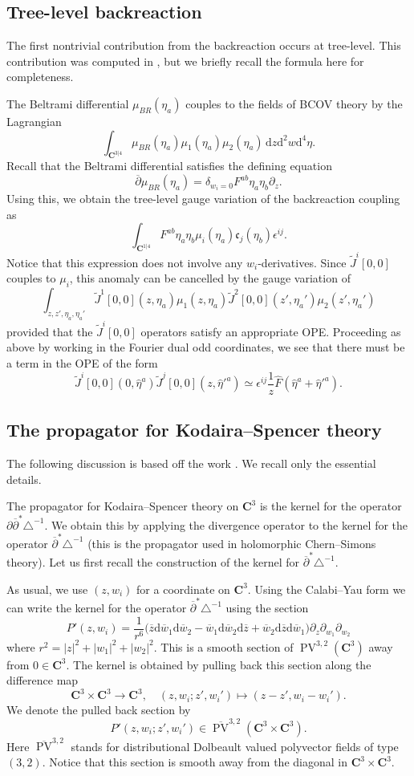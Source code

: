 \documentclass[11pt]{amsart}
\newcommand{\dbar}{\br{\partial}}
\newcommand{\wbar}{\br{w}}
\newcommand{\del}{\partial}
\newcommand{\zbar}{\br{z}}
\newcommand{\PV}{\op{PV}}
\newcommand{\what}{\widehat}
\newcommand{\tr}{\triangle}
\newcommand{\til}{\widetilde}
\newcommand{\br}{\overline}
\newcommand{\CC}{\mathbf C}
\newcommand{\op}{\operatorname}
\newcommand{\mf}{\mathfrak}
\renewcommand{\d}{\mathrm{d}}
\theoremstyle{thm}
\numberwithin{equation}{subsection}
\theoremstyle{def}
\theoremstyle{rem}
\newcommand{\fc}{\mf{c}}
\begin{document}
\subsection{Tree-level backreaction}

The first nontrivial contribution from the backreaction occurs at tree-level. 
This contribution was computed in \cite{CP}, but we briefly recall the formula here for completeness.

The Beltrami differential $\mu_{BR}(\eta_a)$ couples to the fields of BCOV theory by the Lagrangian
\[
\int_{\CC^{3|4}} \mu_{BR} (\eta_a) \mu_1(\eta_a) \mu_2(\eta_a) \, \d z \d^2 w \d^4 \eta .
\]
Recall that the Beltrami differential satisfies the defining equation
\[
\dbar \mu_{BR} (\eta_a) = \delta_{w_i=0} F^{ab} \eta_a \eta_b \partial_z  .
\]
Using this, we obtain the tree-level gauge variation of the backreaction coupling as
\[
\int_{\CC^{1|4}} F^{ab} \eta_a \eta_b \mu_i (\eta_a) \fc_j (\eta_b) \epsilon^{ij}  .
\]
Notice that this expression does not involve any $w_i$-derivatives. 
Since $\til{J}^i[0,0]$ couples to $\mu_i$, this anomaly can be cancelled by the gauge variation of 
\[
\int_{z,z',\eta_a,\eta_a'} \til{J}^1[0,0](z,\eta_a) \mu_1(z,\eta_a) \til{J}^2[0,0] (z',\eta_a') \mu_2(z',\eta_a') 
\]
provided that the $\til{J}^i[0,0]$ operators satisfy an appropriate OPE. 
Proceeding as above by working in the Fourier dual odd coordinates, we see that there must be a term in the OPE of the form
\[
\til{J}^i[0,0](0,\what\eta^a) \til{J}^j [0,0] (z,\what\eta'^a) \simeq \epsilon^{ij} \frac1z \what F (\what\eta^a + \what\eta'^a) .
\]

\subsection{The propagator for Kodaira--Spencer theory}

The following discussion is based off the work \cite{CLbcov1}. 
We recall only the essential details. 

The propagator for Kodaira--Spencer theory on $\CC^3$ is the kernel for the operator $\del \dbar^* \tr^{-1}$. 
We obtain this by applying the divergence operator to the kernel for the operator $\dbar^* \tr^{-1}$ (this is the propagator used in holomorphic Chern--Simons theory). 
Let us first recall the construction of the kernel for $\dbar^* \tr^{-1}$.

As usual, we use $(z,w_i)$ for a coordinate on $\CC^3$. 
Using the Calabi--Yau form we can write the kernel for the operator $\dbar^* \tr^{-1}$ using the section
\[
P'(z,w_i) = \frac{1}{r^6} \big(\zbar \d \wbar_1 \d \wbar_2 - \wbar_1 \d \wbar_2 \d \zbar + \wbar_2 \d \zbar \d \wbar_1 \big) \del_z \del_{w_1} \del_{w_2}  
\]
where $r^2 = |z|^2 + |w_1|^2 + |w_2|^2$. 
This is a smooth section of $\PV^{3,2}(\CC^3)$ away from $0 \in \CC^3$.
The kernel is obtained by pulling back this section along the difference map 
\[
\CC^3 \times \CC^3 \to \CC^3,\quad (z, w_i ; z',w_i') \mapsto (z-z', w_i - w_i') .
\]
We denote the pulled back section by
\[
P'(z,w_i ; z',w_i') \in \br{\PV}^{3,2}(\CC^3 \times \CC^3) . 
\]
Here $\br{\PV}^{3,2}$ stands for distributional Dolbeault valued polyvector fields of type $(3,2)$.
Notice that this section is smooth away from the diagonal in $\CC^3 \times \CC^3$. 
\end{document}

